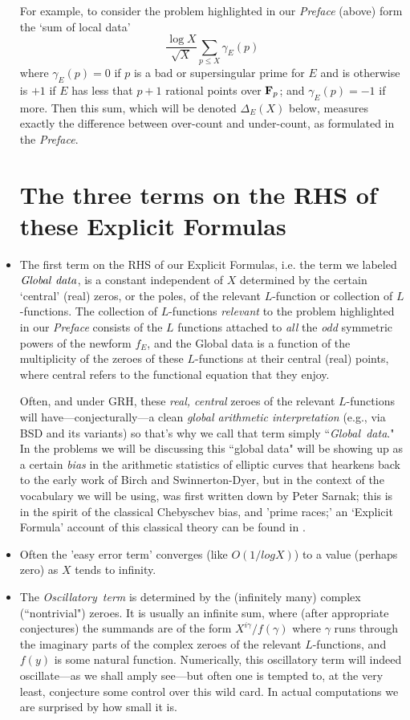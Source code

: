 \documentclass[11pt]{article}
\theoremstyle{plain}
\theoremstyle{definition}
\numberwithin{equation}{section}
\numberwithin{figure}{section}
\numberwithin{table}{section}
\begin{document}
\begin{itemize}
 For example, to consider  the problem highlighted in our {\it Preface} (above) form  the `sum of local data'
  $${\frac{\log X}{{\sqrt X}}}\sum_{p\le X}\gamma_E(p)$$  where $\gamma_E(p)=0$ if $p$ is a bad or supersingular prime for $E$ and is otherwise is $+1$ if $E$ has less that $p+1$ rational points over ${\bf F}_p$; and $\gamma_E(p) = -1$ if more.  Then this sum, which will be denoted $\Delta_E(X)$ below, measures exactly the difference between over-count and under-count, as formulated in the {\it Preface}.\vskip10pt
\section{ The three terms on the RHS  of these Explicit Formulas}
  \vskip10pt
\item The first  term on the RHS of our Explicit Formulas, i.e. the term we labeled ${\rm{\it Global\ data}}$, is a constant independent of $X$   determined by the certain `central'  (real)  zeros, or the poles, of the relevant $L$-function or collection of $L$-functions. The   collection of $L$-functions {\it relevant} to the problem highlighted in our {\it Preface} consists of  the $L$ functions attached to {\it all}  the {\it odd} symmetric powers of the newform $f_E$, and the Global data is a function of the multiplicity of the zeroes of these $L$-functions at their central (real) points, where central refers to the functional equation that they enjoy.

Often, and under GRH, these {\it real, central} zeroes of the relevant $L$-functions will have---conjecturally---a clean {\it global arithmetic interpretation} (e.g., via BSD and its  variants) so that's why we call  that term simply  ``{\rm{\it Global\ data}}."  In the problems we will be discussing this ``global data" will be showing up as a certain {\it bias} in the arithmetic statistics of elliptic curves that hearkens back to the early work of Birch and Swinnerton-Dyer, but in the context of the vocabulary we will be using, was  first written down by Peter Sarnak; this is in the spirit of the classical Chebyschev bias, and 'prime races;' an `Explicit Formula' account of this classical theory can be found in {\cite{GM}}.
\item Often the
'easy error term' converges (like $O(1/
log X)$) to a value  (perhaps zero) as $X$ tends to infinity.
\item The {\rm{\it  Oscillatory\ term}} is determined by the (infinitely many) complex (``nontrivial") zeroes. It is usually  an infinite sum, where  (after appropriate conjectures) the summands are of the form  $X^{i\gamma}/f(\gamma)$ where $\gamma$ runs through the imaginary parts of the complex zeroes of the relevant $L$-functions, and $f(y)$ is some natural function.  Numerically, this oscillatory term will indeed oscillate---as we shall amply see---but often one  is tempted to, at the very least, conjecture some control over this wild card.  In actual computations we are surprised by  how small it is.\end{itemize}
\end{document}
